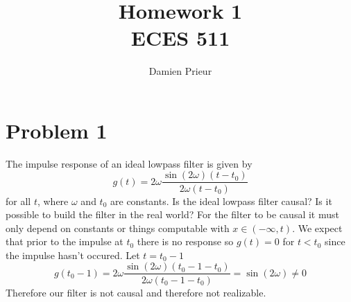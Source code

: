 \documentclass{article}
\author{Damien Prieur}
\title{Homework 1 \\ ECES 511}
\date{}
\begin{document}
\maketitle

\section*{Problem 1}
The impulse response of an ideal lowpass filter is given by
$$ g(t) = 2\omega \frac{\sin(2\omega)(t-t_0)}{2\omega(t-t_0)} $$
for all $t$, where $\omega$ and $t_0$ are constants. Is the ideal lowpass filter causal?
Is it possible to build the filter in the real world?
\newline
\newline
For the filter to be causal it must only depend on constants or things computable with $x \in (-\infty, t)$.
We expect that prior to the impulse at $t_0$ there is no response so $g(t) = 0$ for $t < t_0$ since the impulse hasn't occured.
\newline
\newline
Let $t = t_0 -1$
$$
g(t_0 - 1) = 2\omega \frac{\sin(2\omega)(t_0-1 - t_0)}{2\omega(t_0-1 - t_0)} = \sin(2\omega) \neq 0
$$
Therefore our filter is not causal and therefore not realizable.
\end{document}
